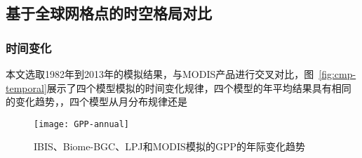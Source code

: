 

\subsection{基于全球网格点的时空格局对比}
\subsubsection{时间变化}
本文选取1982年到2013年的模拟结果，与MODIS产品进行交叉对比，图~\ref{fig:cmp-temporal}展示了四个模型模拟的时间变化规律，四个模型的年平均结果具有相同的变化趋势，，四个模型从月分布规律还是

\begin{figure}[!htbp]
    \centering
    \texttt{[image: GPP-annual]}
    \caption{IBIS、Biome-BGC、LPJ和MODIS模拟的GPP的年际变化趋势}
    \label{fig:GPP-annual}
\end{figure}

